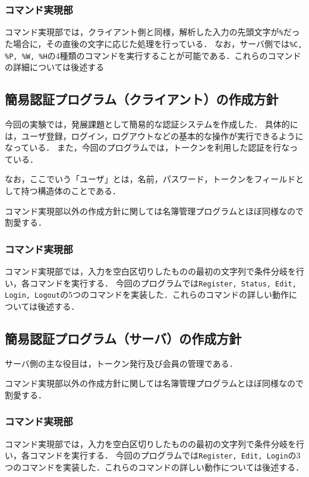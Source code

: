 \documentclass[11pt]{jsarticle}
\begin{document}
\subsubsection{コマンド実現部}
コマンド実現部では，クライアント側と同様，解析した入力の先頭文字が{\tt \%}だった場合に，その直後の文字に応じた処理を行っている．
なお，サーバ側では{\tt \%C, \%P, \%W, \%H}の4種類のコマンドを実行することが可能である．これらのコマンドの詳細については後述する

\subsection{簡易認証プログラム（クライアント）の作成方針}

今回の実験では，発展課題として簡易的な認証システムを作成した．
具体的には，ユーザ登録，ログイン，ログアウトなどの基本的な操作が実行できるようになっている．
また，今回のプログラムでは，トークンを利用した認証を行なっている．

なお，ここでいう「ユーザ」とは，名前，パスワード，トークンをフィールドとして持つ構造体のことである．

コマンド実現部以外の作成方針に関しては名簿管理プログラムとほぼ同様なので割愛する．

\subsubsection{コマンド実現部}
コマンド実現部では，入力を空白区切りしたものの最初の文字列で条件分岐を行い，各コマンドを実行する．
今回のプログラムでは{\tt Register, Status, Edit, Login, Logout}の5つのコマンドを実装した．これらのコマンドの詳しい動作については後述する．

\subsection{簡易認証プログラム（サーバ）の作成方針}

サーバ側の主な役目は，トークン発行及び会員の管理である．

コマンド実現部以外の作成方針に関しては名簿管理プログラムとほぼ同様なので割愛する．

\subsubsection{コマンド実現部}
コマンド実現部では，入力を空白区切りしたものの最初の文字列で条件分岐を行い，各コマンドを実行する．
今回のプログラムでは{\tt Register, Edit, Login}の3つのコマンドを実装した．これらのコマンドの詳しい動作については後述する．
\end{document}
